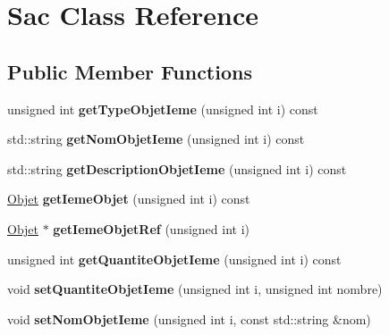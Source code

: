 \hypertarget{class_sac}{}\section{Sac Class Reference}
\label{class_sac}
\subsection*{Public Member Functions}
\begin{DoxyCompactItemize}
\item 
\mbox{\label{class_sac_a051e0f7f295c899a0af5cfb8f82b0483}} 
unsigned int {\bfseries get\+Type\+Objet\+Ieme} (unsigned int i) const
\item 
\mbox{\label{class_sac_ad8d86e7c53ae92e33c8eb89ca5033b55}} 
std\+::string {\bfseries get\+Nom\+Objet\+Ieme} (unsigned int i) const
\item 
\mbox{\label{class_sac_aaf2229263d1f8a1aa091689aead637d0}} 
std\+::string {\bfseries get\+Description\+Objet\+Ieme} (unsigned int i) const
\item 
\mbox{\label{class_sac_af8d00752356d84df7e235c8aeded571b}} 
\hyperlink{class_objet}{Objet} {\bfseries get\+Ieme\+Objet} (unsigned int i) const
\item 
\mbox{\label{class_sac_a41f03b324ccd719767a473fca7d2e8ec}} 
\hyperlink{class_objet}{Objet} $\ast$ {\bfseries get\+Ieme\+Objet\+Ref} (unsigned int i)
\item 
\mbox{\label{class_sac_a09dbee93f5c31ed563d87171de923d8c}} 
unsigned int {\bfseries get\+Quantite\+Objet\+Ieme} (unsigned int i) const
\item 
\mbox{\label{class_sac_afa8ad056c3e5ac4de8daecc6d9772580}} 
void {\bfseries set\+Quantite\+Objet\+Ieme} (unsigned int i, unsigned int nombre)
\item 
\mbox{\label{class_sac_a67fa840e9b489995f7df6a9ed2acdb48}} 
void {\bfseries set\+Nom\+Objet\+Ieme} (unsigned int i, const std\+::string \&nom)
\item 
\mbox{\label{class_sac_a3a49f0071cd2635ec5ef42066dbc93d4}} 

\end{DoxyCompactItemize}
